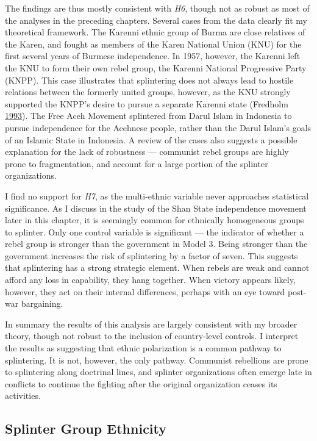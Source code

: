 \documentclass[12pt,]{book}
\theoremstyle{definition}
\theoremstyle{definition}
\theoremstyle{remark}
\begin{document}
The findings are thus mostly consistent with \emph{H6}, though not as
robust as most of the analyses in the preceding chapters. Several cases
from the data clearly fit my theoretical framework. The Karenni ethnic
group of Burma are close relatives of the Karen, and fought as members
of the Karen National Union (KNU) for the first several years of Burmese
independence. In 1957, however, the Karenni left the KNU to form their
own rebel group, the Karenni National Progressive Party (KNPP). This
case illustrates that splintering does not always lead to hostile
relations between the formerly united groups, however, as the KNU
strongly supported the KNPP's desire to pursue a separate Karenni state
(Fredholm \protect\hyperlink{ref-Fredholm1993}{1993}). The Free Aceh
Movement splintered from Darul Islam in Indonesia to pursue independence
for the Acehnese people, rather than the Darul Islam's goals of an
Islamic State in Indonesia. A review of the cases also suggests a
possible explanation for the lack of robustness --- communist rebel
groups are highly prone to fragmentation, and account for a large
portion of the splinter organizations.

I find no support for \emph{H7}, as the multi-ethnic variable never
approaches statistical significance. As I discuss in the study of the
Shan State independence movement later in this chapter, it is seemingly
common for ethnically homogeneous groups to splinter. Only one control
variable is significant --- the indicator of whether a rebel group is
stronger than the government in Model 3. Being stronger than the
government increases the risk of splintering by a factor of seven. This
suggests that splintering has a strong strategic element. When rebels
are weak and cannot afford any loss in capability, they hang together.
When victory appears likely, however, they act on their internal
differences, perhaps with an eye toward post-war bargaining.

In summary the results of this analysis are largely consistent with my
broader theory, though not robust to the inclusion of country-level
controls. I interpret the results as suggesting that ethnic polarization
is a common pathway to splintering. It is not, however, the only
pathway. Communist rebellions are prone to splintering along doctrinal
lines, and splinter organizations often emerge late in conflicts to
continue the fighting after the original organization ceases its
activities.

\subsection{Splinter Group Ethnicity}\label{splinter-group-ethnicity}
\end{document}
